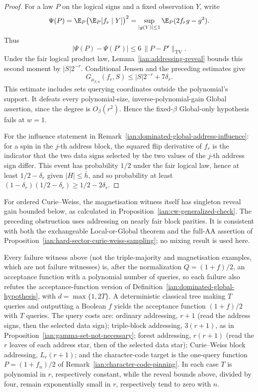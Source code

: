 \begin{proof}
For a law \(P\) on the logical signs and a fixed observation \(Y\),
write
\[
 \Psi(P)=\E_P\bigl(\E_P[f_r\mid Y]\bigr)^2
 =\sup_{|g(Y)|\le1}\E_P(2f_rg-g^2).
\]
Thus
\[
 |\Psi(P)-\Psi(P')|\le6\,\|P-P'\|_{\mathrm{TV}}.
\]
Under the fair logical product law,
Lemma~\ref{ian:addressing-reveal} bounds this second moment by
\(|S|2^{-r}\). Conditional Jensen and the preceding estimates give
\[
 G_{\mu_{\beta,n}}(f_r,S)
 \le |S|2^{-r}+7\delta_r.
\]
This estimate includes sets querying coordinates outside the
polynomial's support. It defeats every polynomial-size,
inverse-polynomial-gain Global assertion, since the degree is
\(O_\beta(r^2)\). Hence the fixed-\(\beta\) Global-only hypothesis
fails at \(w=1\).

For the influence statement in
Remark~\ref{ian:dominated-global-address-influence}: for a spin in the
\(j\)-th address block, the squared flip derivative of \(f_r\) is the
indicator that the two data signs selected by the two values of the
\(j\)-th address sign differ. This event has probability \(1/2\) under
the fair logical law, hence at least \(1/2-\delta_r\) given
\(|H|\le\bar h\), and so probability at least
\((1-\delta_r)(1/2-\delta_r)\ge1/2-2\delta_r\).
\end{proof}

\begin{remark}
\label{ian:dominated-global-cw-magnetisation}
For ordered Curie--Weiss, the magnetisation witness itself has
singleton reveal gain bounded below, as calculated in
Proposition~\ref{ian:cw-generalized-check}. The preceding obstruction
uses addressing on nearly fair block parities. It is consistent
with both the exchangeable Local-or-Global theorem and the full-AA
assertion of Proposition~\ref{ian:hard-sector-curie-weiss-sampling};
no mixing result is used here.
\end{remark}

\begin{remark}
\label{ian:dominated-global-acceptance-witnesses}
Every failure witness above (not the triple-majority and magnetisation
examples, which are not failure witnesses) is, after the normalization \(Q=(1+f)/2\), an
acceptance function with a polynomial number of queries, so each
failure also refutes the acceptance-function version of
Definition~\ref{ian:dominated-global-hypothesis}, with
\(d=\max\{1,2T\}\). A deterministic classical tree making \(T\) queries
and outputting a Boolean \(f\) yields the acceptance function
\((1+f)/2\) with \(T\) queries. The query costs are: ordinary
addressing, \(r+1\) (read the address signs, then the selected data
sign); triple-block addressing, \(3(r+1)\), as in
Proposition~\ref{ian:gamma-set-not-necessary}; forest addressing,
\(r(r+1)\) (read the \(r\) leaves of each address star, then of the
selected data star); Curie--Weiss block addressing, \(L_r(r+1)\); and
the character-code target is the one-query function \(P=(1+f_n)/2\) of
Remark~\ref{ian:character-code-pinning}. In each case \(T\) is
polynomial in \(r\), respectively constant, while the reveal bounds
above, divided by four, remain exponentially small in \(r\),
respectively tend to zero with \(n\).
\end{remark}

